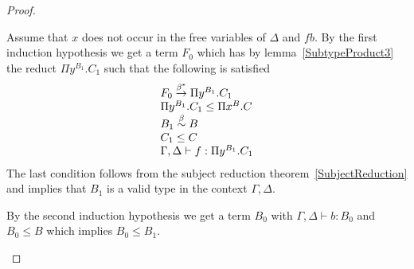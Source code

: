 \begin{lemma}
\begin{proof}
{\begin{enumerate}
\begin{enumerate}
                Assume that $x$ does not occur in the free variables of $\Delta$
                and $f b$. By the first induction hypothesis we get a term $F_0$
                which has by lemma~\ref{SubtypeProduct3} the reduct $\Pi
                y^{B_1}. C_1$ such that the following is satisfied
                $$
                \begin{array}{l}
                    F_0 \stackrel{\beta^*}{\to} \Pi y^{B_1}. C_1
                    \\
                    \Pi y^{B_1}. C_1 \le \Pi x^B. C
                    \\
                    B_1 \stackrel{\beta}{\sim} B
                    \\
                    C_1 \le C
                    \\
                    \Gamma,\Delta \vdash f: \Pi y^{B_1}. C_1
                \end{array}
                $$
                The last condition follows from the subject reduction
                theorem~\ref{SubjectReduction} and implies that $B_1$ is a valid
                type in the context $\Gamma,\Delta$.

                By the second induction hypothesis we get a term $B_0$ with
                $\Gamma,\Delta \vdash b : B_0$ and $B_0 \le B$ which implies
                $B_0 \le B_1$.


\end{enumerate}
\end{enumerate}}
\end{proof}
\end{lemma}
